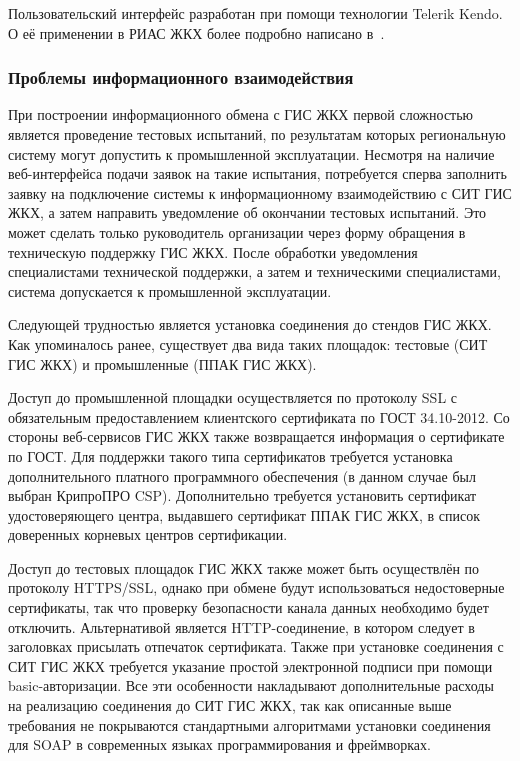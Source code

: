 Пользовательский интерфейс разработан при помощи технологии Telerik Kendo.
О её применении в РИАС ЖКХ более подробно написано в~\cite{moiseev_kendo}.


\subsubsection{Проблемы информационного взаимодействия}

При построении информационного обмена с ГИС ЖКХ первой сложностью является проведение тестовых испытаний, по результатам которых региональную систему могут допустить к промышленной эксплуатации.
Несмотря на наличие веб-интерфейса подачи заявок на такие испытания, потребуется сперва заполнить заявку на подключение системы к информационному взаимодействию с СИТ ГИС ЖКХ, а затем направить уведомление об окончании тестовых испытаний.
Это может сделать только руководитель организации через форму обращения в техническую поддержку ГИС ЖКХ.
После обработки уведомления специалистами технической поддержки, а затем и техническими специалистами, система допускается к промышленной эксплуатации.

Следующей трудностью является установка соединения до стендов ГИС ЖКХ.
Как упоминалось ранее, существует два вида таких площадок: тестовые (СИТ ГИС ЖКХ) и промышленные (ППАК ГИС ЖКХ).

Доступ до промышленной площадки осуществляется по протоколу SSL с обязательным предоставлением клиентского сертификата по ГОСТ 34.10-2012.
Со стороны веб-сервисов ГИС ЖКХ также возвращается информация о сертификате по ГОСТ.
Для поддержки такого типа сертификатов требуется установка дополнительного платного программного обеспечения (в данном случае был выбран КрипроПРО CSP).
Дополнительно требуется установить сертификат удостоверяющего центра, выдавшего сертификат ППАК ГИС ЖКХ, в список доверенных корневых центров сертификации.

Доступ до тестовых площадок ГИС ЖКХ также может быть осуществлён по протоколу HTTPS/SSL, однако при обмене будут использоваться недостоверные сертификаты, так что проверку безопасности канала данных необходимо будет отключить.
Альтернативой является HTTP-соединение, в котором следует в заголовках присылать отпечаток сертификата.
Также при установке соединения с СИТ ГИС ЖКХ требуется указание простой электронной подписи при помощи basic-авторизации.
Все эти особенности накладывают дополнительные расходы на реализацию соединения до СИТ ГИС ЖКХ, так как описанные выше требования не покрываются стандартными алгоритмами установки соединения для SOAP в современных языках программирования и фреймворках.

